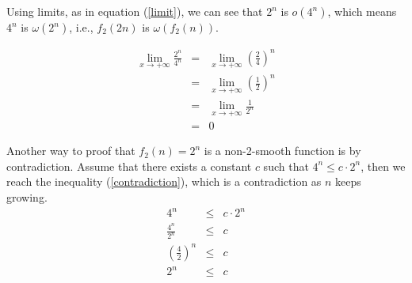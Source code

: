 \documentclass[12pt]{scrartcl}
\begin{document}
\begin{enumerate}
\begin{enumerate}
		Using limits, as in equation (\ref{limit}), we can see that $2^n$ is $o(4^n)$, which means $4^n$ is $\omega(2^n)$, i.e., $f_2(2n)$ is $\omega(f_2(n))$.
		
		\begin{eqnarray}\label{limit}
			\lim_{x \to + \infty} \frac{2^n}{4^n}	&	=	& \lim_{x \to + \infty} \left(\frac{2}{4}\right)^n	 \nonumber \\
												&	=	& \lim_{x \to + \infty} \left(\frac{1}{2}\right)^n	 \nonumber \\
												&	=	& \lim_{x \to + \infty} \frac{1}{2^n} \nonumber \\
												&	=	&	0
		\end{eqnarray}
		
		Another way to proof that $f_2(n) = 2^n$ is a non-2-smooth function is by contradiction. Assume that there exists a constant $c$ such that $4^n \le c \cdot 2^n$, then we reach the inequality (\ref{contradiction}), which is a contradiction as $n$ keeps growing.
		\begin{eqnarray}\label{contradiction}
					4^n					&	\le	&	c \cdot 2^n \nonumber \\
			\frac{4^n}{2^n}				&	\le	&	c \nonumber \\
			\left(\frac{4}{2}\right)^n	&	\le	&	c \nonumber \\
					2^n					&	\le	&	c 
		\end{eqnarray}
		

\end{enumerate}
\end{enumerate}
\end{document}

